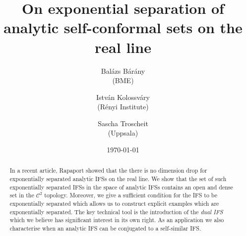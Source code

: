 \documentclass[11pt,]{article}
\title{On exponential separation of analytic self-conformal sets on the real line}
\author{Bal\'azs B\'ar\'any\\(BME) \and Istv\'an
  Kolossv\'ary\\ (R\'enyi Institute) \and Sascha
Troscheit \\(Uppsala)}
\date{\today}
\theoremstyle{definition}
\theoremstyle{remark}
\newcommand{\0}{\mathbf{0}}
\begin{document}
\frenchspacing
\maketitle


\begin{abstract}
In a recent article, Rapaport showed that the there is no dimension drop for
exponentially separated analytic IFSs on the real line. We show that the set of such exponentially
separated IFSs in the space of analytic IFSs contains an open and dense set in the $\mathcal{C}^2$
topology. Moreover, we give a sufficient condition for the IFS to be exponentially separated which
allows us to construct explicit examples which are exponentially separated. The key
technical tool is the introduction of the \emph{dual IFS} which we believe has significant interest
in its own right. As an application we also characterise when an analytic IFS can be conjugated to a
self-similar IFS. 
\end{abstract}


%
%

\end{document}
